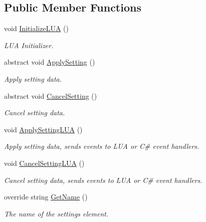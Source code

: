 \subsection*{Public Member Functions}
\begin{DoxyCompactItemize}
\item 
void \hyperlink{class_base_settings_element_af2b10653291d4617dea28ee26e1c1c6c}{Initialize\+L\+UA} ()
\begin{DoxyCompactList}\small\item\em L\+UA Initializer. \end{DoxyCompactList}\item 
abstract void \hyperlink{class_base_settings_element_aecb484325110e7b97ec6e4d92d856ab1}{Apply\+Setting} ()
\begin{DoxyCompactList}\small\item\em Apply setting data. \end{DoxyCompactList}\item 
abstract void \hyperlink{class_base_settings_element_a66f796e4aaa1e660a7db3e69547412d3}{Cancel\+Setting} ()
\begin{DoxyCompactList}\small\item\em Cancel setting data. \end{DoxyCompactList}\item 
void \hyperlink{class_base_settings_element_ae9513390026665164b754fbb19a54f53}{Apply\+Setting\+L\+UA} ()
\begin{DoxyCompactList}\small\item\em Apply setting data, sends events to L\+UA or C\# event handlers. \end{DoxyCompactList}\item 
void \hyperlink{class_base_settings_element_a540fa858362bb8643d88c03c28d4e455}{Cancel\+Setting\+L\+UA} ()
\begin{DoxyCompactList}\small\item\em Cancel setting data, sends events to L\+UA or C\# event handlers. \end{DoxyCompactList}\item 
override string \hyperlink{class_base_settings_element_a01da3ad61726996dfbf111a2bcabe166}{Get\+Name} ()
\begin{DoxyCompactList}\small\item\em The name of the settings element. \end{DoxyCompactList}\end{DoxyCompactItemize}
